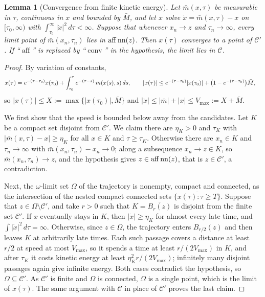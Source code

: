 \documentclass{article} %
\newcommand{\iclrstart}{\begin{aligned}&}\newcommand{\iclrend}{\end{aligned}}
\newcommand{\iclrallow}{\allowbreak}
\newcommand{\iclrstart}{}\newcommand{\iclrend}{}\newcommand{\iclrallow}{}
\theoremstyle{plain}
\newtheorem{lemma}[theorem]{Lemma}
\theoremstyle{definition}
\theoremstyle{remark}
\begin{document}
\begin{lemma}[Convergence from finite kinetic energy]
\label{lem:conv}
Let $\bar m(x,\tau)$ be measurable in $\tau$, continuous in $x$ and bounded by $\bar M$, and let
$x$ solve $\dot x=\bar m(x,\tau)-x$ on $[\tau_0,\infty)$ with $\int_{\tau_0}^\infty|\dot x|^2\,d\tau
<\infty$. Suppose that whenever $x_n\to z$ and $\tau_n\to\infty$, every limit point of
$\bar m(x_n,\tau_n)$ lies in $\operatorname{aff}\operatorname{nn}(z)$. Then $x(\tau)$ converges to a point of
$\mathcal C'$. If ``$\operatorname{aff}$'' is replaced by ``$\operatorname{conv}$'' in the
hypothesis, the limit lies in $\mathcal C$.
\end{lemma}
\begin{proof}
By variation of constants,
\[
\iclrstart x(\tau)=e^{-(\tau-\tau_0)}x(\tau_0)+\int_{\tau_0}^\tau e^{-(\tau-s)}\,\bar m(x(s),s)\,ds,
\iclrqbr
|x(\tau)|\le e^{-(\tau-\tau_0)}|x(\tau_0)|+\bigl(1-e^{-(\tau-\tau_0)}\bigr)\bar M,\iclrend
\]
so $|x(\tau)|\le X:=\max\{|x(\tau_0)|,\bar M\}$ and $|\dot x|\le|\bar m|+|x|\le V_{\max}:=X+\bar M$.

We first show that the speed is bounded below away from the candidates. Let $K$ be a compact set
disjoint from $\mathcal C'$. We claim there are $\eta_K>0$ and $\tau_K$ with
$|\bar m(x,\tau)-x|\ge\eta_K$ for all $x\in K$ and $\tau\ge\tau_K$. Otherwise there are $x_n\in K$
and $\tau_n\to\infty$ with $\bar m(x_n,\tau_n)-x_n\to0$; along a subsequence $x_n\to z\in K$, so
$\bar m(x_n,\tau_n)\to z$, and the hypothesis gives $z\in\operatorname{aff}\operatorname{nn}(z)$, that is
$z\in\mathcal C'$, a contradiction.

Next, the $\omega$-limit set $\Omega$ of the trajectory is nonempty, compact and connected, as
the intersection of the nested compact connected sets $\overline{\{x(\tau):\tau\ge T\}}$. Suppose
that $z\in\Omega\setminus\mathcal C'$, and take $r>0$ such that $K=\overline{B_r(z)}$ is
disjoint from the finite set $\mathcal C'$. If $x$ eventually stays in $K$, then $|\dot x|\ge\eta_K$
for almost every late time, and $\int|\dot x|^2\,d\tau=\infty$. Otherwise, since $z\in\Omega$, the
trajectory enters $B_{r/2}(z)$ and then leaves $K$ at arbitrarily late times. Each such passage
covers a distance at least $r/2$ at speed at most $V_{\max}$, so it spends a time at least
$r/(2V_{\max})$ in $K$, and after $\tau_K$ it costs kinetic energy at least
$\eta_K^2r/(2V_{\max})$; infinitely many disjoint passages again give infinite energy. Both cases
contradict the hypothesis, so $\Omega\subseteq\mathcal C'$. As $\mathcal C'$ is finite and $\Omega$
is connected, $\Omega$ is a single point, which is the limit of $x(\tau)$. The same argument with
$\mathcal C$ in place of $\mathcal C'$ proves the last claim.
\end{proof}
\end{document}
